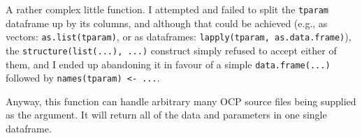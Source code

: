 A rather complex little function. I attempted and failed to split the \texttt{tparam} dataframe up by its columns, and although that could be achieved (e.g., as vectors: \texttt{as.list(tparam)}, or as dataframes: \texttt{lapply(tparam, as.data.frame)}), the \texttt{structure(list(...), ...)} construct simply refused to accept either of them, and I ended up abandoning it in favour of a simple \texttt{data.frame(...)} followed by \texttt{names(tparam) <- ...}.

Anyway, this function can handle arbitrary many OCP source files being supplied as the argument.
It will return all of the data and parameters in one single dataframe.
